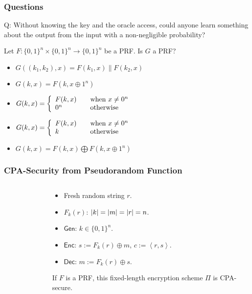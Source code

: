 \begin{frame}\frametitle{Questions}
\begin{alertblock}{Q: Without knowing the key and the oracle access, could anyone learn something about the output from the input with a non-negligible probability?} 
\end{alertblock}
\begin{exampleblock}{Let $F: \{0,1\}^{n} \times \{0,1\}^{n} \to \{0,1\}^{n}$ be a PRF. Is $G$ a PRF?}
\begin{itemize}
\item $G((k_{1},k_{2}), x) = F(k_{1},x) \| F(k_{2},x)$
\item $G(k,x) = F(k, x\oplus 1^{n})$
\item $ G(k,x) = \left\{ 
  \begin{array}{l l}
    F(k,x) & \quad \text{when}\ x \neq 0^{n}\\
    0^{n} & \quad \text{otherwise}\\
  \end{array} \right. $
\item $ G(k,x) = \left\{ 
  \begin{array}{l l}
    F(k,x) & \quad \text{when}\ x \neq 0^{n}\\
    k & \quad \text{otherwise}\\
  \end{array} \right. $
\item $G(k,x) = F(k,x)\bigoplus F(k, x\oplus 1^{n})$
\end{itemize}
\end{exampleblock}
\end{frame}
\begin{frame}\frametitle{CPA-Security from Pseudorandom Function}
\begin{columns}[t]
\begin{column}{4cm}
\begin{figure}
\begin{center}

\end{center}
\end{figure}
\end{column}
\begin{column}{6cm}
\begin{construction}\label{thm:cpa}
\begin{itemize}
\item Fresh random string $r$.
\item $F_k(r)$: $\lvert k\rvert = \lvert m\rvert = \lvert r\rvert = n$.
\item $\mathsf{Gen}$: $k \in \{0,1\}^n$.
\item $\mathsf{Enc}$: $s := F_k(r)\oplus m$, $c := \left<r, s\right>$.
\item $\mathsf{Dec}$: $m := F_k(r)\oplus s$.
\end{itemize}
\end{construction}
\begin{theorem}\label{thm:prf}
If $F$ is a PRF, this fixed-length encryption scheme $\Pi$ is CPA-secure.
\end{theorem}
\end{column}
\end{columns}
\end{frame}
